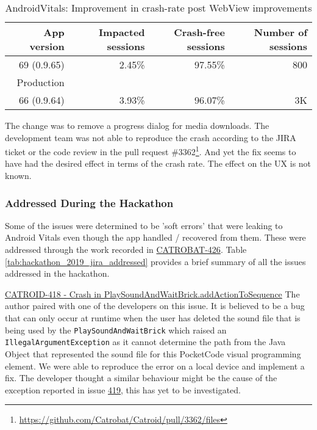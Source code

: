 \begin{table}[ht]
    \centering
    \footnotesize
    \begin{tabular}{r|r|r|r}
        App version &Impacted sessions &Crash-free sessions &Number of sessions  \\
        \hline
        69 (0.9.65) &2.45\% &	97.55\% 	&~800 \\
        Production &&& \\
        \hline
        66 (0.9.64) &3.93\% &96.07\% 	&~3K
    \end{tabular}
    \caption{AndroidVitals: Improvement in crash-rate post WebView improvements}
    \label{tab:androidvitals_rollout_of_0_9_65}
\end{table}

The change was to remove a progress dialog for media downloads. The development team was not able to reproduce the crash according to the JIRA ticket or the code review in the pull request \#3362\footnote{\url{https://github.com/Catrobat/Catroid/pull/3362/files}}. And yet the fix seems to have had the desired effect in terms of the crash rate. The effect on the UX is not known.

\subsubsection{Addressed During the Hackathon}
Some of the issues were determined to be 'soft errors' that were leaking to Android Vitals even though the app handled / recovered from them. These were addressed through the work recorded in  \href{https://jira.catrob.at/browse/CATROID-426}{CATROBAT-426}. Table \ref{tab:hackathon_2019_jira_addressed} provides a brief summary of all the issues addressed in the hackathon.


\href{https://jira.catrob.at/browse/CATROID-418}{CATROID-418 - Crash in PlaySoundAndWaitBrick.addActionToSequence} The author paired with one of the developers on this issue. It is believed to be a bug that can only occur at runtime when the user has deleted the sound file that is being used by the \texttt{PlaySoundAndWaitBrick} which raised an \texttt{IllegalArgumentException} as it cannot determine the path from the Java Object that represented the sound file for this PocketCode visual programming element. We were able to reproduce the error on a local device and implement a fix. The developer thought a similar behaviour might be the cause of the exception reported in issue \href{https://jira.catrob.at/browse/CATROID-419}{419}, this has yet to be investigated.

